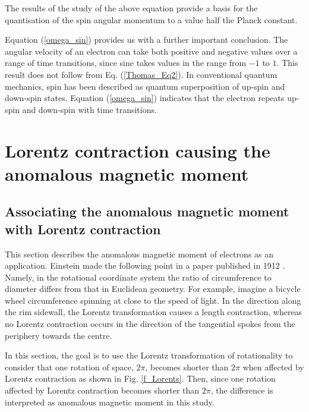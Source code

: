 \documentclass[10.5pt]{article}
\numberwithin{equation}{section}
\begin{document}
The results of the study of the above equation provide a basis for the quantisation of the spin angular momentum to a value half the Planck constant.


Equation (\ref{omega_sin}) provides us with a further important conclusion. The angular velocity of an electron can take both positive and negative values over a range of time transitions, since sine takes values in the range from $-1$ to $1$. This result does not follow from Eq. (\ref{Thomas_Eq2}). In conventional quantum mechanics, spin has been described as quantum superposition of up-spin and down-spin states. Equation (\ref{omega_sin}) indicates that the electron repeats up-spin and down-spin with time transitions.

\section{Lorentz contraction causing the anomalous magnetic moment}

\subsection{Associating the anomalous magnetic moment with Lorentz contraction}


This section describes the anomalous magnetic moment of electrons as an application. Einstein made the following point in a paper published in 1912 \cite{Einstein}. Namely, in the rotational coordinate system the ratio of circumference to diameter differs from that in Euclidean geometry. For example, imagine a bicycle wheel circumference spinning at close to the speed of light. In the direction along the rim sidewall, the Lorentz transformation causes a length contraction, whereas no Lorentz contraction occurs in the direction of the tangential spokes from the periphery towards the centre.

In this section, the goal is to use the Lorentz transformation of rotationality to consider that one rotation of space, $2\pi$, becomes shorter than $2\pi$ when affected by Lorentz contraction as shown in Fig. \ref{f_Lorents}.  Then, since one rotation affected by Lorentz contraction becomes shorter than $2\pi$, the difference is interpreted as anomalous magnetic moment in this study.
\end{document}
